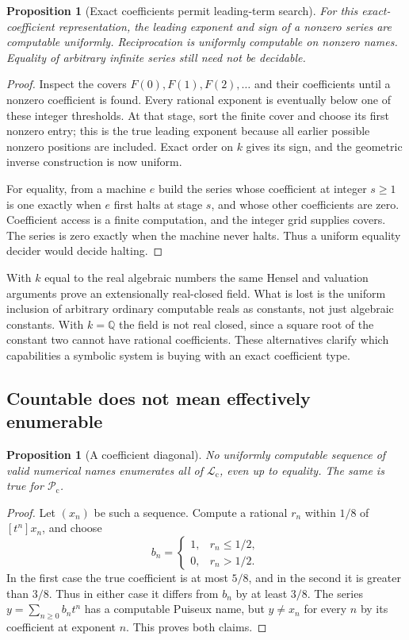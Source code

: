 \documentclass[11pt,letterpaper]{article}
\numberwithin{equation}{section}
\newtheorem{proposition}[theorem]{Proposition}
\theoremstyle{definition}
\theoremstyle{remark}
\newcommand{\Lc}{\mathcal L_{\mathrm c}}
\newcommand{\Pc}{\mathcal P_{\mathrm c}}
\newcommand{\Q}{\mathbb Q}
\newcommand{\coef}[2]{[t^{#1}]#2}
\begin{document}
\begin{proposition}[Exact coefficients permit leading-term search]
\label{prop:exactcoeffs}
For this exact-coefficient representation, the leading exponent and sign
of a nonzero series are computable uniformly. Reciprocation is uniformly
computable on nonzero names. Equality of arbitrary infinite series still
need not be decidable.
\end{proposition}
\begin{proof}
Inspect the covers $F(0),F(1),F(2),\ldots$ and their coefficients until a
nonzero coefficient is found. Every rational exponent is eventually below
one of these integer thresholds. At that stage, sort the finite cover and
choose its first nonzero entry; this is the true leading exponent because
all earlier possible nonzero positions are included. Exact order on $k$
gives its sign, and the geometric inverse construction is now uniform.

For equality, from a machine $e$ build the series whose coefficient at
integer $s\ge1$ is one exactly when $e$ first halts at stage $s$, and whose
other coefficients are zero. Coefficient access is a finite computation,
and the integer grid supplies covers. The series is zero exactly when the
machine never halts. Thus a uniform equality decider would decide halting.
\end{proof}

With $k$ equal to the real algebraic numbers the same Hensel and valuation
arguments prove an extensionally real-closed field. What is lost is the
uniform inclusion of arbitrary ordinary computable reals as constants,
not just algebraic constants. With $k=\Q$ the field is not real closed,
since a square root of the constant two cannot have rational coefficients.
These alternatives clarify which capabilities a symbolic system is buying
with an exact coefficient type.

\subsection{Countable does not mean effectively enumerable}

\begin{proposition}[A coefficient diagonal]
\label{prop:diagonal}
No uniformly computable sequence of valid numerical names enumerates all
of $\Lc$, even up to equality. The same is true for $\Pc$.
\end{proposition}
\begin{proof}
Let $(x_n)$ be such a sequence. Compute a rational $r_n$ within $1/8$ of
$\coef n{x_n}$, and choose
\[
 b_n=\begin{cases}1,&r_n\le1/2,\\0,&r_n>1/2.\end{cases}
\]
In the first case the true coefficient is at most $5/8$, and in the
second it is greater than $3/8$. Thus in either case it differs from $b_n$
by at least $3/8$. The series $y=\sum_{n\ge0}b_nt^n$ has a computable
Puiseux name, but $y\ne x_n$ for every $n$ by its coefficient at exponent
$n$. This proves both claims.
\end{proof}
\end{document}
